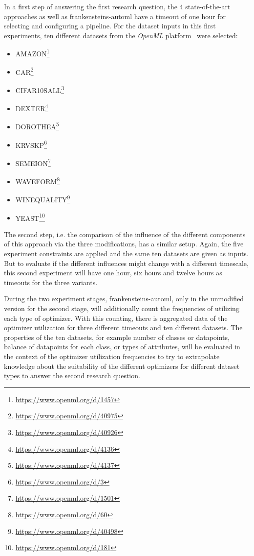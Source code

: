 In a first step of answering the first research question, the 4 state-of-the-art approaches as well as frankensteins-automl have a timeout of one hour for selecting and configuring a pipeline.
For the dataset inputs in this first experiments, ten different datasets from the \textit{OpenML} platform~\cite{Vanschoren-OpenML} were selected:
\begin{itemize}
    \item AMAZON\footnote{\url{https://www.openml.org/d/1457}}
    \item CAR\footnote{\url{https://www.openml.org/d/40975}}
    \item CIFAR10SALL\footnote{\url{https://www.openml.org/d/40926}}
    \item DEXTER\footnote{\url{https://www.openml.org/d/4136}}
    \item DOROTHEA\footnote{\url{https://www.openml.org/d/4137}}
    \item KRVSKP\footnote{\url{https://www.openml.org/d/3}}
    \item SEMEION\footnote{\url{https://www.openml.org/d/1501}}
    \item WAVEFORM\footnote{\url{https://www.openml.org/d/60}}
    \item WINEQUALITY\footnote{\url{https://www.openml.org/d/40498}}
    \item YEAST\footnote{\url{https://www.openml.org/d/181}}
\end{itemize}

The second step, i.e. the comparison of the influence of the different components of this approach via the three modifications, has a similar setup.
Again, the five experiment constraints are applied and the same ten datasets are given as inputs.
But to evaluate if the different influences might change with a different timescale, this second experiment will have one hour, six hours and twelve hours as timeouts for the three variants.

During the two experiment stages, frankensteins-automl, only in the unmodified version for the second stage, will additionally count the frequencies of utilizing each type of optimizer.
With this counting, there is aggregated data of the optimizer utilization for three different timeouts and ten different datasets.
The properties of the ten datasets, for example number of classes or datapoints, balance of datapoints for each class, or types of attributes, will be evaluated in the context of the optimizer utilization frequencies to try to extrapolate knowledge about the suitability of the different optimizers for different dataset types to answer the second research question.


